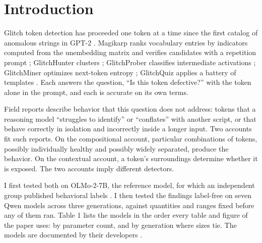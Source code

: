 \documentclass[11pt]{article}
\begin{document}
\section{Introduction}\label{introduction}

Glitch token detection has proceeded one token at a time since the first catalog of anomalous strings in GPT-2 \citep{rumbelow2023}. Magikarp ranks vocabulary entries by indicators computed from the unembedding matrix and verifies candidates with a repetition prompt \citep{land2024}; GlitchHunter clusters \citep{li2024}; GlitchProber classifies intermediate activations \citep{zhang2024}; GlitchMiner optimizes next-token entropy \citep{wu2026}; GlitchQuiz applies a battery of templates \citep{tang2026}. Each answers the question, ``Is this token defective?'' with the token alone in the prompt, and each is accurate on its own terms.

Field reports describe behavior that this question does not address: tokens that a reasoning model ``struggles to identify'' or ``conflates'' with another script, or that behave correctly in isolation and incorrectly inside a longer input. Two accounts fit such reports. On the compositional account, particular combinations of tokens, possibly individually healthy and possibly widely separated, produce the behavior. On the contextual account, a token's surroundings determine whether it is exposed. The two accounts imply different detectors.

I first tested both on OLMo-2-7B, the reference model, for which an independent group published behavioral labels \citep[3,171 tokens tested by repetition probe, 442 verified as failing]{land2024}. I then tested the findings label-free on seven Qwen models across three generations, against quantities and ranges fixed before any of them ran. Table 1 lists the models in the order every table and figure of the paper uses: by parameter count, and by generation where sizes tie. The models are documented by their developers \citep{olmo2025,qwen25,qwen3,qwen38}.

\begingroup\scriptsize\setlength{\tabcolsep}{4pt}\renewcommand{\arraystretch}{1.15}
\end{document}
